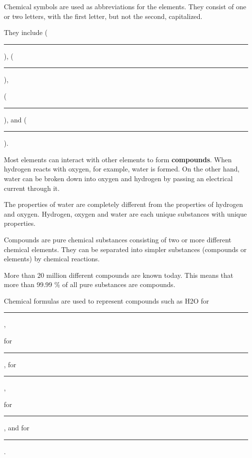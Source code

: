 Chemical symbols are used as abbreviations for the elements. They consist of one or two letters, with the first letter, but not the second, capitalized.


They include   (\rule{35mm}{0.4pt}),   (\rule{35mm}{0.4pt}),


 (\rule{35mm}{0.4pt}), and  (\rule{35mm}{0.4pt}).


Most elements can interact with other elements to form \textbf{compounds}. When hydrogen reacts with oxygen, for example, water is formed. On the other hand, water can be broken down into oxygen and hydrogen by passing an electrical current through it.


The properties of water are completely different from the properties of hydrogen and oxygen. Hydrogen, oxygen and water are each unique substances with unique properties.


Compounds are pure chemical substances consisting of two or more different chemical elements. They can be separated into simpler substances (compounds or elements) by chemical reactions.


More than 20 million different compounds are known today. This means that more than 99.99 \% of all pure substances are compounds.


Chemical formulas are used to represent compounds such as H2O for \rule{35mm}{0.4pt},


 for \rule{35mm}{0.4pt},  for \rule{35mm}{0.4pt},


 for \rule{35mm}{0.4pt}, and  for \rule{35mm}{0.4pt}.



\begin{center}%
\resizebox{0.92\linewidth}{!}{\PhysicalProcessSummaryFigure}\end{center}


\begin{center}%
\resizebox{0.92\linewidth}{!}{\ChemicalReactionSummaryFigure}\end{center}

